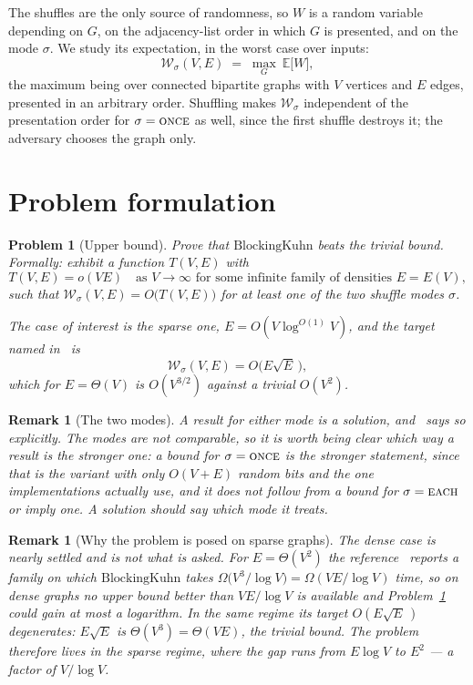 \documentclass[10pt]{article}
\newtheorem{problem}{Problem}
\newtheorem{remark}[theorem]{Remark}
\newcommand{\BKuhn}{\text{BlockingKuhn}}
\newcommand{\Ex}{\mathbb{E}}
\newcommand{\ONCE}{\textup{\textsc{once}}}
\newcommand{\EACH}{\textup{\textsc{each}}}
\begin{document}
The shuffles are the only source of randomness, so $W$ is a random variable
depending on $G$, on the adjacency-list order in which $G$ is presented, and on
the mode $\sigma$. We study its expectation, in the worst case over inputs:
\[
  \mathcal{W}_\sigma(V,E)
  \;=\;
  \max_{G}\ \Ex\bigl[W\bigr],
\]
the maximum being over connected bipartite graphs with $V$ vertices and $E$
edges, presented in an arbitrary order. Shuffling makes
$\mathcal{W}_\sigma$ independent of the presentation order for
$\sigma=\ONCE$ as well, since the first shuffle destroys it; the
adversary chooses the graph only.

\section{Problem formulation}

\begin{problem}[Upper bound]\label{prob:upper}
Prove that $\BKuhn$ beats the trivial bound. Formally: exhibit a function
$T(V,E)$ with
\[
  T(V,E)=o(VE)\quad\text{as }V\to\infty\text{ for some infinite family of
  densities }E=E(V),
\]
such that $\mathcal{W}_\sigma(V,E)=O\bigl(T(V,E)\bigr)$ for at least one of the
two shuffle modes $\sigma$.

The case of interest is the sparse one, $E=O(V\log^{O(1)}V)$, and the target
named in~\cite{Kaban19} is
\[
  \mathcal{W}_\sigma(V,E)=O\bigl(E\sqrt E\,\bigr),
\]
which for $E=\Theta(V)$ is $O(V^{3/2})$ against a trivial $O(V^{2})$.
\end{problem}

\begin{remark}[The two modes]\label{rem:modes}
A result for either mode is a solution, and~\cite{Kaban19} says so explicitly.
The modes are not comparable, so it is worth being clear which way a result is
the stronger one: a bound for $\sigma=\ONCE$ is the stronger statement, since
that is the variant with only $O(V+E)$ random bits and the one implementations
actually use, and it does not follow from a bound for $\sigma=\EACH$ or imply
one. A solution should say which mode it treats.
\end{remark}

\begin{remark}[Why the problem is posed on sparse graphs]\label{rem:dense}
The dense case is nearly settled and is not what is asked.
For $E=\Theta(V^{2})$ the reference~\cite{Kaban19} reports a family on which
$\BKuhn$ takes $\Omega\bigl(V^{3}/\log V\bigr)=\Omega(VE/\log V)$ time, so on
dense graphs no upper bound better than $VE/\log V$ is available and
Problem~\ref{prob:upper} could gain at most a logarithm. In the same regime its
target $O(E\sqrt E\,)$ degenerates: $E\sqrt E$ is $\Theta(V^{3})=\Theta(VE)$,
the trivial bound. The problem therefore lives in the sparse regime, where the
gap runs from $E\log V$ to $E^{2}$ --- a factor of $V/\log V$.
\end{remark}
\end{document}
